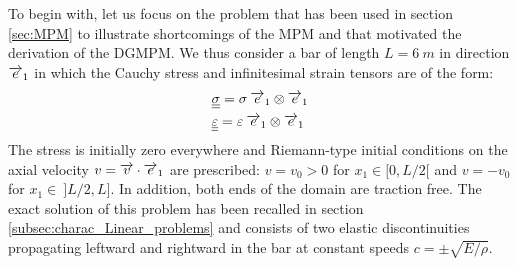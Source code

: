 To begin with, let us focus on the problem that has been used in section \ref{sec:MPM} to illustrate shortcomings of the MPM and that motivated the derivation of the DGMPM.
We thus consider a bar of length $L=6\:m$ in direction ${\overrightarrow{e}}_1$ in which the Cauchy stress and infinitesimal strain tensors are of the form:
\begin{align*}
  & {\underline{\underline{\sigma}}} = \sigma \: {\overrightarrow{e}}_1\otimes {\overrightarrow{e}}_1 \\
  & {\underline{\underline{\varepsilon}}} = \varepsilon \: {\overrightarrow{e}}_1\otimes {\overrightarrow{e}}_1
\end{align*}
The stress is initially zero everywhere and Riemann-type initial conditions on the axial velocity $v={\overrightarrow{v}}\cdot{\overrightarrow{e}}_1$ are prescribed: $v=v_0>0$ for $x_1\in [0,L/2[$ and $v=-v_0$ for $x_1\in \:]L/2,L]$. In addition, both ends of the domain are traction free.
The exact solution of this problem \cite[Ch.1]{Wang} has been recalled in section \ref{subsec:charac_Linear_problems} and consists of two elastic discontinuities propagating leftward and rightward in the bar at constant speeds $c=\pm\sqrt{E/\rho}$. 

